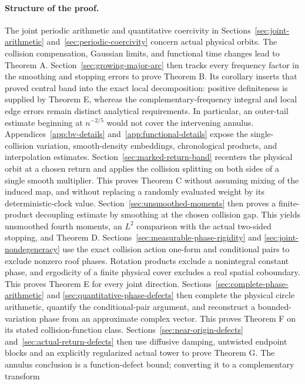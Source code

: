 \documentclass[11pt,reqno]{amsart}
\numberwithin{equation}{section}
\theoremstyle{definition}\newtheorem{definition}[theorem]{Definition}
\theoremstyle{remark}\newtheorem{remark}[theorem]{Remark}
\begin{document}
\paragraph{Structure of the proof.}
The joint periodic arithmetic and quantitative coercivity in
Sections~\ref{sec:joint-arithmetic} and~\ref{sec:periodic-coercivity}
concern actual physical orbits. The collision compensation, Gaussian
limits, and functional time changes lead to Theorem A.
Section~\ref{sec:growing-major-arc} then tracks every frequency factor
in the smoothing and stopping errors to prove Theorem B. Its corollary
inserts that proved central band into the exact local decomposition:
positive definiteness is supplied by Theorem E, whereas the
complementary-frequency integral and local edge errors remain distinct
analytical requirements. In particular, an outer-tail
estimate beginning at $n^{-2/5}$ would not cover the intervening annulus.
Appendices~\ref{app:bv-details} and~\ref{app:functional-details} expose
the single-collision variation, smooth-density embeddings,
chronological products, and interpolation estimates. Section~\ref{sec:marked-return-band} recenters the physical orbit at a
chosen return and applies the collision splitting on both sides of a
single smooth multiplier. This proves Theorem C without assuming
mixing of the induced map, and without replacing a randomly evaluated
weight by its deterministic-clock value. Section~\ref{sec:unsmoothed-moments} then proves a finite-product
decoupling estimate by smoothing at the chosen collision gap. This
yields unsmoothed fourth moments, an $L^2$ comparison with the actual
two-sided stopping, and Theorem D.
Sections~\ref{sec:measurable-phase-rigidity} and
\ref{sec:joint-nondegeneracy} use the exact collision action one-form
and conditional pairs to exclude nonzero roof phases. Rotation products
exclude a nonintegral constant phase, and ergodicity of a finite physical
cover excludes a real spatial coboundary. This proves Theorem E for
every joint direction. Sections~\ref{sec:complete-phase-arithmetic} and
\ref{sec:quantitative-phase-defects} then complete the physical circle
arithmetic, quantify the conditional-pair argument, and reconstruct a
bounded-variation phase from an approximate complex vector. This proves
Theorem F on its stated collision-function class.
Sections~\ref{sec:near-origin-defects} and~\ref{sec:actual-return-defects}
then use diffusive damping, untwisted endpoint blocks and an explicitly
regularized actual tower to prove Theorem G. The annulus conclusion is
a function-defect bound; converting it to a complementary transform
\end{document}
